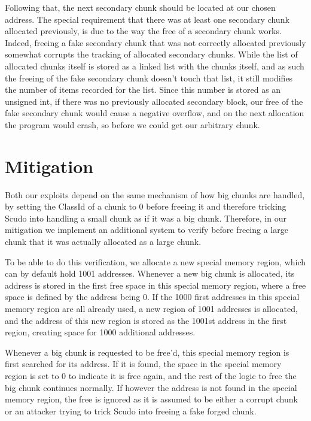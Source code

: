 \documentclass[a4paper,11pt,oneside]{report}
\begin{document}
Following that, the next secondary chunk should be located at our chosen address. The
special requirement that there was at least one secondary chunk allocated previously, is
due to the way the free of a secondary chunk works. Indeed, freeing a fake secondary chunk
that was not correctly allocated previously somewhat corrupts the tracking of allocated
secondary chunks. While the list of allocated chunks itself is stored as a linked list
with the chunks itself, and as such the freeing of the fake secondary chunk doesn't touch
that list, it still modifies the number of items recorded for the list. Since this number
is stored as an unsigned int, if there was no previously allocated secondary block, our
free of the fake secondary chunk would cause a negative overflow, and on the next
allocation the program would crash, so before we could get our arbitrary chunk.


\chapter{Mitigation}

Both our exploits depend on the same mechanism of how big chunks are handled, by setting
the ClassId of a chunk to 0 before freeing it and therefore tricking Scudo into handling a
small chunk as if it was a big chunk. Therefore, in our mitigation we implement an
additional system to verify before freeing a large chunk that it was actually allocated as
a large chunk.

To be able to do this verification, we allocate a new special memory region, which can by
default hold 1001 addresses. Whenever a new big chunk is allocated, its address is stored
in the first free space in this special memory region, where a free space is defined by
the address being 0. If the 1000 first addresses in this special memory region are all
already used, a new region of 1001 addresses is allocated, and the address of this new
region is stored as the 1001st address in the first region, creating space for 1000
additional addresses.

Whenever a big chunk is requested to be free'd, this special memory region is first
searched for its address. If it is found, the space in the special memory region is set to
0 to indicate it is free again, and the rest of the logic to free the big chunk continues
normally. If however the address is not found in the special memory region, the free is
ignored as it is assumed to be either a corrupt chunk or an attacker trying to trick Scudo
into freeing a fake forged chunk.
\end{document}
